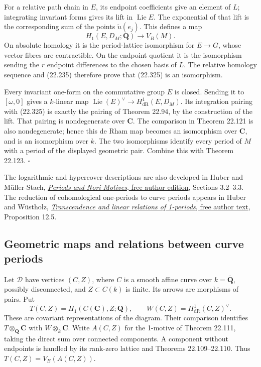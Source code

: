 \documentclass[
  11pt,
  a4paper,
]{article}
\begin{document}
For a relative path chain in \(E\), its endpoint coefficients give an
element of \(L\); integrating invariant forms gives its lift in
\(\operatorname{Lie}E\). The exponential of that lift is the
corresponding sum of the points \(\widetilde u(e_j)\). This defines a
map \[
 H_1(E,D_M;\mathbf Q)\longrightarrow V_B(M).
 \tag{22.325}
\] On absolute homology it is the period-lattice isomorphism for
\(E\to G\), whose vector fibres are contractible. On the endpoint
quotient it is the isomorphism sending the \(r\) endpoint differences to
the chosen basis of \(L\). The relative homology sequence and (22.235)
therefore prove that (22.325) is an isomorphism.

Every invariant one-form on the commutative group \(E\) is closed.
Sending it to \([\omega,0]\) gives a \(k\)-linear map
\(\operatorname{Lie}(E)^\vee\to H^1_{\mathrm{dR}}(E,D_M)\). Its
integration pairing with (22.325) is exactly the pairing of Theorem
22.94, by the construction of the lift. That pairing is nondegenerate
over \(\mathbf C\). The comparison in Theorem 22.121 is also
nondegenerate; hence this de Rham map becomes an isomorphism over
\(\mathbf C\), and is an isomorphism over \(k\). The two isomorphisms
identify every period of \(M\) with a period of the displayed geometric
pair. Combine this with Theorem 22.123. \(\square\)

The logarithmic and hypercover descriptions are also developed in Huber
and Müller-Stach,
\href{https://home.mathematik.uni-freiburg.de/arithgeom/preprints/buch-alt/buch-v6.pdf}{\emph{Periods
and Nori Motives}, free author edition}, Sections 3.2--3.3. The
reduction of cohomological one-periods to curve periods appears in Huber
and Wüstholz,
\href{https://home.mathematik.uni-freiburg.de/arithgeom/preprints/huber-einsmotive.pdf}{\emph{Transcendence
and linear relations of 1-periods}, free author text}, Proposition 12.5.

\subsection{Geometric maps and relations between curve
periods}\label{geometric-maps-and-relations-between-curve-periods}

Let \(\mathcal D\) have vertices \((C,Z)\), where \(C\) is a smooth
affine curve over \(k=\overline{\mathbf Q}\), possibly disconnected, and
\(Z\subset C(k)\) is finite. Its arrows are morphisms of pairs. Put \[
 T(C,Z)=H_1(C(\mathbf C),Z;\mathbf Q),\qquad
 W(C,Z)=H^1_{\mathrm{dR}}(C,Z)^\vee.
 \tag{22.326}
\] These are covariant representations of the diagram. Their comparison
identifies \(T\otimes_{\mathbf Q}\mathbf C\) with
\(W\otimes_k\mathbf C\). Write \(A(C,Z)\) for the 1-motive of Theorem
22.111, taking the direct sum over connected components. A component
without endpoints is handled by its rank-zero lattice and Theorems
22.109--22.110. Thus \(T(C,Z)=V_B(A(C,Z))\).
\end{document}
